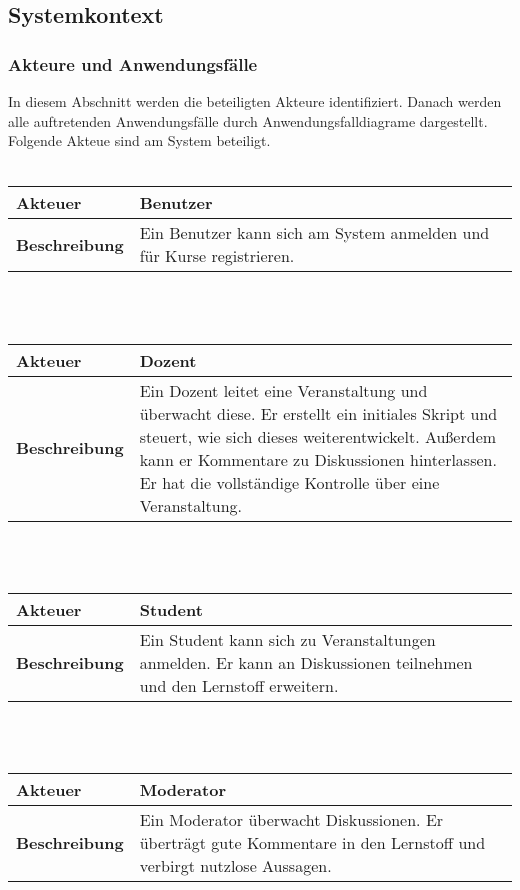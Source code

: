 \documentclass[12pt,a4paper]{article}
\begin{document}
\subsection{Systemkontext}
\subsubsection{Akteure und Anwendungsfälle}
In diesem Abschnitt werden die beteiligten Akteure identifiziert. Danach werden alle auftretenden Anwendungsfälle durch Anwendungsfalldiagrame dargestellt.
Folgende Akteue sind am System beteiligt.\\\\

\begin{tabular}{l p{10cm}}
\textbf{Akteuer} & Benutzer \\ 
\hline \textbf{Beschreibung} & Ein Benutzer kann sich am System anmelden und für Kurse registrieren. \\ 
\hline 
\end{tabular}\\\\

\begin{tabular}{l p{10cm}}
\textbf{Akteuer} & Dozent \\ 
\hline \textbf{Beschreibung} & Ein Dozent leitet eine Veranstaltung und überwacht diese. Er erstellt ein initiales Skript und steuert, wie sich dieses weiterentwickelt. Außerdem kann er Kommentare zu Diskussionen hinterlassen. Er hat die vollständige Kontrolle über eine Veranstaltung.\\ 
\hline 
\end{tabular}\\\\

\begin{tabular}{l p{10cm}}
\textbf{Akteuer} & Student \\ 
\hline \textbf{Beschreibung} & Ein Student kann sich zu Veranstaltungen anmelden. Er kann an Diskussionen teilnehmen und den Lernstoff erweitern.\\ 
\hline 
\end{tabular}\\\\

\begin{tabular}{l p{10cm}}
\textbf{Akteuer} & Moderator \\ 
\hline \textbf{Beschreibung} & Ein Moderator überwacht Diskussionen. Er überträgt gute Kommentare in den Lernstoff und verbirgt nutzlose Aussagen.\\ 
\hline 
\end{tabular}\\\\
\end{document}
